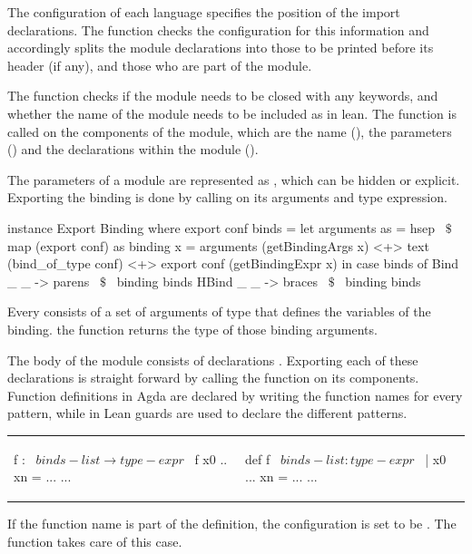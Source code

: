 The configuration of each language specifies the position of the import declarations. The function  checks the configuration for this information and accordingly splits the module declarations into those to be printed before its header (if any), and those who are part of the module. 

The   function checks if the module needs to be closed with any keywords, and whether the name of the module needs to be included as in lean. The  function is called on the components of the module, which are the name (), the parameters () and the declarations within the module (). 

The parameters of a module are represented as \lstmath{[Binding]}, which can be hidden or explicit. Exporting the binding is done by calling  on its arguments and type expression.  
\begin{hscode}
instance Export Binding where
  export conf binds =
    let arguments as = hsep ~$\$$~ map (export conf) as
        binding x =  
          arguments (getBindingArgs x) <+> text (bind_of_type conf) 
          <+> export conf (getBindingExpr x)
    in case binds of
      Bind  _ _ -> parens ~$\$$~ binding binds
      HBind _ _ -> braces ~$\$$~ binding binds

\end{hscode}
Every  consists of a set of arguments of type  that defines the variables of the binding. the function  returns the type of those binding arguments. 

The body of the module consists of declarations \lstmath{[Decl]}. Exporting each of these declarations is straight forward by calling the  function on its components. Function definitions in Agda are declared by writing the function names for every pattern, while in Lean guards are used to declare the different patterns. 
\newline
\begin{tabular}{p{18em} p{10em}}
\begin{agdacode} 
f : ~$binds-list \to type-expr$~   
f x0 .. xn = ... 
...    
\end{agdacode}  
&
\begin{leancode}
def f ~$binds-list : type-expr$~ 
| x0 ... xn = ... 
... 
\end{leancode}
\end{tabular}
\newline
If the function name is part of the definition, the configuration is set to be . The function  takes care of this case. 

